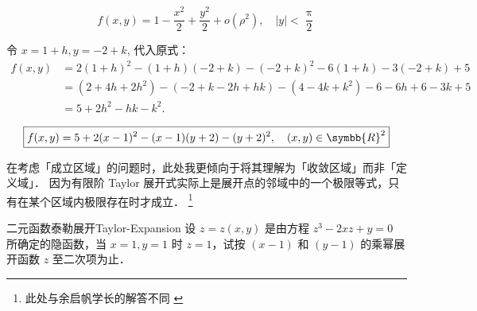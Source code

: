 \begin{solution}
    \begin{equation}
        \boxed{f(x, y) = 1 - \frac{x^2}{2} + \frac{y^2}{2} + o(\rho^2), \quad |y| < \frac{\uppi}{2}}
    \end{equation}


    令 $x = 1+h, y = -2+k$, 代入原式：
    \begin{equation}
        \begin{aligned}
            f(x, y) & = 2(1+h)^2 - (1+h)(-2+k) - (-2+k)^2 - 6(1+h) - 3(-2+k) + 5  \\
                    & = (2+4h+2h^2) - (-2+k-2h+hk) - (4-4k+k^2) - 6-6h + 6-3k + 5 \\
                    & = 5 + 2h^2 - hk - k^2.
        \end{aligned}
    \end{equation}

    \begin{equation}
        \boxed{f(x, y) = 5 + 2(x-1)^2 - (x-1)(y+2) - (y+2)^2, \quad (x, y) \in \symbb{R}^2}
    \end{equation}
\end{solution}

\begin{note}{}{}
    在考虑「成立区域」的问题时，此处我更倾向于将其理解为「收敛区域」而非「定义域」．
    因为有限阶 Taylor 展开式实际上是展开点的邻域中的一个极限等式，只有在某个区域内极限存在时才成立．
    \footnote{此处与余启帆学长的解答不同 \cite{Yu2021MathAnalysis}}
\end{note}


\begin{problem}{二元函数泰勒展开}{Taylor-Expansion}
    设 $z = z(x,y)$ 是由方程 $z^3 - 2xz + y = 0$ 所确定的隐函数，当 $x = 1, y = 1$ 时 $z = 1$，试按 $(x - 1)$ 和 $(y - 1)$ 的乘幂展开函数 $z$ 至二次项为止．
\end{problem}

